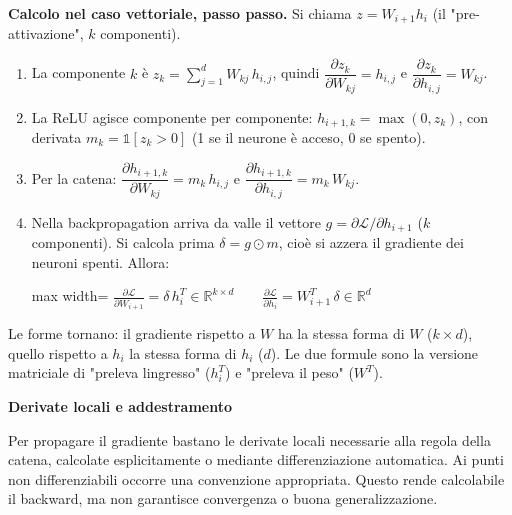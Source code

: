 \documentclass[11pt,a4paper,oneside,openany]{book}
\providecommand{\tightlist}{\setlength{\itemsep}{0pt}\setlength{\parskip}{0pt}}
\renewenvironment{quote}{\list{}{\leftmargin=1em\rightmargin=0pt}\item\relax}{\endlist}
\begin{document}
\textbf{Calcolo nel caso vettoriale, passo passo.} Si chiama \(z = W_{i+1}h_i\) (il "pre-attivazione", \(k\) componenti).

\begin{enumerate}
\def\labelenumi{\arabic{enumi}.}
\tightlist
\item
  La componente \(k\) è \(z_k = \sum_{j=1}^{d} W_{kj}\,h_{i,j}\), quindi \(\dfrac{\partial z_k}{\partial W_{kj}} = h_{i,j}\) e \(\dfrac{\partial z_k}{\partial h_{i,j}} = W_{kj}\).
\item
  La ReLU agisce componente per componente: \(h_{i+1,k} = \max(0, z_k)\), con derivata \(m_k = \mathbb{1}[z_k > 0]\) (1 se il neurone è acceso, 0 se spento).
\item
  Per la catena: \(\dfrac{\partial h_{i+1,k}}{\partial W_{kj}} = m_k\,h_{i,j}\) e \(\dfrac{\partial h_{i+1,k}}{\partial h_{i,j}} = m_k\,W_{kj}\).
\item
  Nella backpropagation arriva da valle il vettore \(g = \partial\mathcal{L}/\partial h_{i+1}\) (\(k\) componenti). Si calcola prima \(\delta = g \odot m\), cioè si azzera il gradiente dei neuroni spenti. Allora: \begin{center}
\begin{adjustbox}{max width=\linewidth}
$\displaystyle \boxed{\frac{\partial\mathcal{L}}{\partial W_{i+1}} = \delta\, h_i^{T} \in \mathbb{R}^{k\times d}}\qquad\boxed{\frac{\partial\mathcal{L}}{\partial h_i} = W_{i+1}^{T}\,\delta \in \mathbb{R}^{d}}$
\end{adjustbox}
\end{center}
\end{enumerate}

Le forme tornano: il gradiente rispetto a \(W\) ha la stessa forma di \(W\) (\(k\times d\)), quello rispetto a \(h_i\) la stessa forma di \(h_i\) (\(d\)). Le due formule sono la versione matriciale di "preleva l\textquotesingle ingresso" (\(h_i^T\)) e "preleva il peso" (\(W^T\)).

\begin{quote}
\textbf{Derivate locali e addestramento}
\end{quote}

\begin{quote}
Per propagare il gradiente bastano le derivate locali necessarie alla regola della catena, calcolate esplicitamente o mediante differenziazione automatica. Ai punti non differenziabili occorre una convenzione appropriata. Questo rende calcolabile il backward, ma non garantisce convergenza o buona generalizzazione.
\end{quote}
\end{document}
